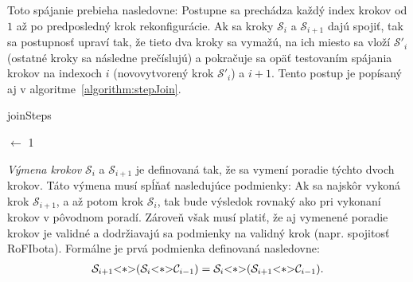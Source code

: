 \documentclass[
  digital, %
  oneside, %
  table,   %
  lof,     %
  nolot,     %
]{fithesis3}
\begin{document}
Toto spájanie prebieha nasledovne: Postupne sa prechádza každý index krokov od $1$ až po predposledný krok rekonfigurácie. Ak sa kroky $\mathcal{S}_i$ a $\mathcal{S}_{i + 1}$ dajú spojiť, tak sa postupnosť upraví tak, že tieto dva kroky sa vymažú, na ich miesto sa vloží $\mathcal{S}'_i$ (ostatné kroky sa následne prečíslujú) a pokračuje sa opäť testovaním spájania krokov na indexoch $i$ (novovytvorený krok $\mathcal{S}'_i$) a $i + 1$. Tento postup je popísaný aj v algoritme~\ref{algorithm:stepJoin}. 

\begin{algorithm}
    \caption{joinSteps}
    \label{algorithm:stepJoin}
    \DontPrintSemicolon
    
    \CurrIndex $\leftarrow$ 1\;
\end{algorithm}

\textit{Výmena krokov} $\mathcal{S}_i$ a $\mathcal{S}_{i + 1}$ je definovaná tak, že sa vymení poradie týchto dvoch krokov. Táto výmena musí spĺňať nasledujúce podmienky: Ak sa najskôr vykoná krok $\mathcal{S}_{i + 1}$, a až potom krok $\mathcal{S}_i$, tak bude výsledok rovnaký ako pri vykonaní krokov v pôvodnom poradí. Zároveň však musí platiť, že aj vymenené poradie krokov je validné a dodržiavajú sa podmienky na validný krok (napr. spojitosť RoFIbota). Formálne je prvá podmienka definovaná nasledovne: 
\begin{align}
\label{align:stepSwap}
\mathcal{S}_{i + 1} \lstinline{<*>} (\mathcal{S}_i \lstinline{<*>} \mathcal{C}_{i - 1}) = \mathcal{S}_i \lstinline{<*>} (\mathcal{S}_{i + 1} \lstinline{<*>} \mathcal{C}_{i - 1}). 
\end{align}
\end{document}
